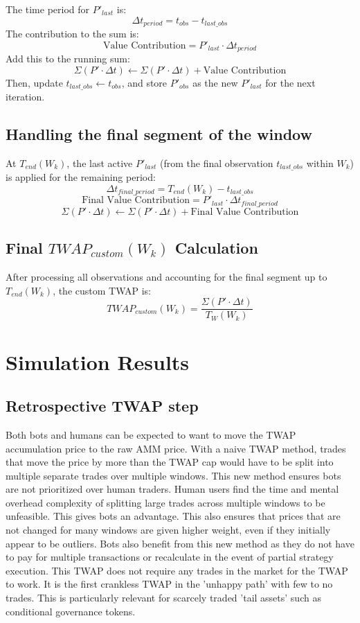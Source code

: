 \documentclass{article}
\begin{document}
The time period for $P'_{last}$ is:
\[ \Delta t_{period} = t_{obs} - t_{last\_obs} \]
The contribution to the sum is:
\[ \text{Value Contribution} = P'_{last} \cdot \Delta t_{period} \]
Add this to the running sum:
\[ \Sigma (P' \cdot \Delta t) \leftarrow \Sigma (P' \cdot \Delta t) + \text{Value Contribution} \]
Then, update $t_{last\_obs} \leftarrow t_{obs}$, and store $P'_{obs}$ as the new $P'_{last}$ for the next iteration.

\subsection*{Handling the final segment of the window}
At $T_{end}(W_k)$, the last active $P'_{last}$ (from the final observation $t_{last\_obs}$ within $W_k$) is applied for the remaining period:
\[ \Delta t_{final\_period} = T_{end}(W_k) - t_{last\_obs} \]
\[ \text{Final Value Contribution} = P'_{last} \cdot \Delta t_{final\_period} \]
\[ \Sigma (P' \cdot \Delta t) \leftarrow \Sigma (P' \cdot \Delta t) + \text{Final Value Contribution} \]

\subsection*{Final $TWAP_{custom}(W_k)$ Calculation}
After processing all observations and accounting for the final segment up to $T_{end}(W_k)$, the custom TWAP is:
\[ TWAP_{custom}(W_k) = \frac{\Sigma (P' \cdot \Delta t)}{T_W(W_k)} \]

\section{Simulation Results}

\subsection{Retrospective TWAP step}
Both bots and humans can be expected to want to move the TWAP accumulation price to the raw AMM price. With a naive TWAP method, trades that move the price by more than the TWAP cap would have to be split into multiple separate trades over multiple windows. This new method ensures bots are not prioritized over human traders. Human users find the time and mental overhead complexity of splitting large trades across multiple windows to be unfeasible. This gives bots an advantage. This also ensures that prices that are not changed for many windows are given higher weight, even if they initially appear to be outliers. Bots also benefit from this new method as they do not have to pay for multiple transactions or recalculate in the event of partial strategy execution. This TWAP does not require any trades in the market for the TWAP to work. It is the first crankless TWAP in the 'unhappy path' with few to no trades. This is particularly relevant for scarcely traded 'tail assets' such as conditional governance tokens. 
\end{document}
